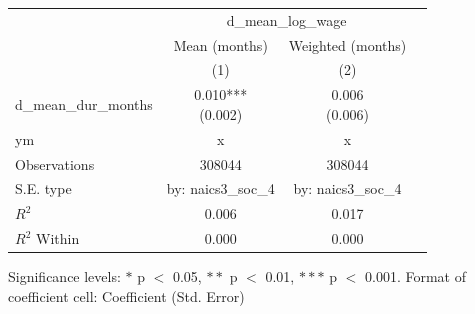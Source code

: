 \renewcommand\cellalign{t}
\begin{threeparttable}
\begin{tabular}{lccc}
\toprule
 & \multicolumn{2}{c}{d_mean_log_wage} \\
\cmidrule(lr){2-3} 
 & Mean (months) & Weighted (months) \\
 & (1) & (2) \\
\midrule
\addlinespace
d_mean_dur_months & \makecell{0.010*** \\ (0.002)} & \makecell{0.006 \\ (0.006)} \\
\midrule
\addlinespace
ym & x & x \\
\midrule
\addlinespace
Observations & 308044 & 308044 \\
S.E. type & by: naics3_soc_4 & by: naics3_soc_4 \\
$R^2$ & 0.006 & 0.017 \\
$R^2$ Within & 0.000 & 0.000 \\
\bottomrule
\end{tabular}
\footnotesize Significance levels: $*$ p $<$ 0.05, $**$ p $<$ 0.01, $***$ p $<$ 0.001. Format of coefficient cell: Coefficient 
 (Std. Error)
\end{threeparttable}